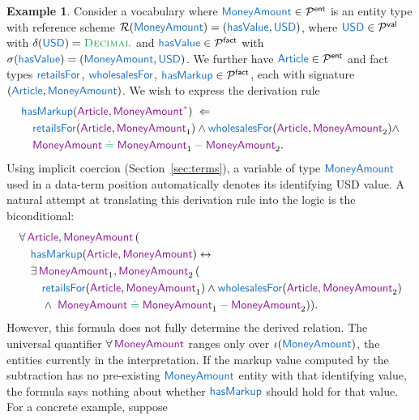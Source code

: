 \documentclass[11pt]{amsart}
\theoremstyle{definition}
\newtheorem{example}{Example}
\theoremstyle{remark}
\newcommand{\Preds}{\mathcal{P}}
\newcommand{\EntPreds}{\Preds^{\textsf{ent}}}
\newcommand{\ValPreds}{\Preds^{\textsf{val}}}
\newcommand{\FactPreds}{\Preds^{\textsf{fact}}}
\newcommand{\RefSchemes}{\mathcal{R}}
\newcommand{\pr}[1]{\mathsf{\textcolor{RoyalBlue}{#1}}}
\newcommand{\var}[1]{\mathsf{\textcolor{Plum}{#1}}}
\newcommand{\dataOp}[1]{\mathbin{\textcolor{ForestGreen}{#1}}}
\newcommand{\dataEq}{\mathrel{\textcolor{ForestGreen}{\doteq}}}
\newcommand{\dt}[1]{\mathsf{\textcolor{ForestGreen}{\textsc{#1}}}}
\newcommand{\dvar}[1]{\var{#1}^{\textcolor{Magenta}{*}}}
\begin{document}
\begin{example}
\label{ex:markup}
Consider a vocabulary where $\pr{MoneyAmount} \in \EntPreds$ is an entity
type with reference scheme $\RefSchemes(\pr{MoneyAmount}) = (\pr{hasValue},
\pr{USD})$, where $\pr{USD} \in \ValPreds$ with $\delta(\pr{USD}) =
\dt{Decimal}$ and $\pr{hasValue} \in \FactPreds$ with
$\sigma(\pr{hasValue}) = (\pr{MoneyAmount}, \pr{USD})$. We further have
$\pr{Article} \in \EntPreds$ and fact types $\pr{retailsFor}$,
$\pr{wholesalesFor}$, $\pr{hasMarkup} \in \FactPreds$, each with signature
$(\pr{Article}, \pr{MoneyAmount})$. We wish to express the derivation rule
$$\begin{aligned}[t]
  & \pr{hasMarkup}(\var{Article}, \dvar{MoneyAmount}) \;\Leftarrow\; \\
  & \quad \pr{retailsFor}(\var{Article}, \var{MoneyAmount}_1) \wedge
    \pr{wholesalesFor}(\var{Article}, \var{MoneyAmount}_2) \wedge \\
  & \quad \var{MoneyAmount} \dataEq \var{MoneyAmount}_1 \dataOp{-} \var{MoneyAmount}_2.
\end{aligned}$$
Using implicit coercion (Section~\ref{sec:terms}), a variable of type
$\pr{MoneyAmount}$ used in a data-term position automatically denotes its
identifying USD value. A natural attempt at translating this derivation
rule into the logic is the biconditional:
$$\begin{aligned}[t]
  &\forall\, \var{Article}, \var{MoneyAmount} \, ( \\
  &\quad \pr{hasMarkup}(\var{Article}, \var{MoneyAmount}) \leftrightarrow \\
  &\quad \exists\, \var{MoneyAmount}_1, \var{MoneyAmount}_2 \, ( \\
  &\quad\quad \pr{retailsFor}(\var{Article}, \var{MoneyAmount}_1) \wedge
    \pr{wholesalesFor}(\var{Article}, \var{MoneyAmount}_2) \\
  &\quad\quad \wedge\; \var{MoneyAmount} \dataEq
    \var{MoneyAmount}_1 \dataOp{-} \var{MoneyAmount}_2 ) ).
\end{aligned}$$
However, this formula does not fully determine the derived relation. The
universal quantifier $\forall\, \var{MoneyAmount}$ ranges only over
$\iota(\pr{MoneyAmount})$, the entities currently in the interpretation.
If the markup value computed by the subtraction has no pre-existing
$\pr{MoneyAmount}$ entity with that identifying value, the formula says
nothing about whether $\pr{hasMarkup}$ should hold for that value.
For a concrete example, suppose
\begin{align*}

\end{align*}
\end{example}
\end{document}
